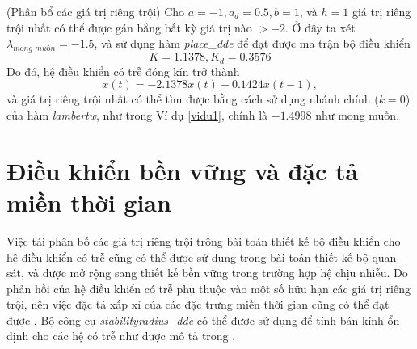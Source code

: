 \begin{vd}(Phân bổ các giá trị riêng trội)
	Cho $a=-1,a_d=0.5,b=1$, và $h=1$ giá trị riêng trội nhất có thể được gán bằng bất kỳ giá trị nào $>-2$. Ở đây ta xét $\lambda_{\textit{mong muốn}}=-1.5$, và sử dụng hàm \textit{place\_dde} để đạt được ma trận bộ điều khiển
	$$K=1.1378,K_d=0.3576$$
	Do đó, hệ điều khiển có trễ đóng kín trở thành
	$$x(t)=-2.1378x(t)+0.1424x(t-1),$$
	và giá trị riêng trội nhất có thể tìm được bằng cách sử dụng nhánh chính ($k=0$) của hàm \textit{lambertw}, như trong Ví dụ \ref{vidu1}, chính là $-1.4998$ như mong muốn.
\end{vd}

\section{Điều khiển bền vững và đặc tả miền thời gian}
Việc tái phân bố các giá trị riêng trội trông bài toán thiết kế bộ điều khiển cho hệ điều khiển có trễ cũng có thể được sử dụng trong bài toán thiết kế bộ quan sát, và được mở rộng sang thiết kế bền vững trong trường hợp hệ chịu nhiễu. Do phản hồi của hệ điều khiển có trễ phụ thuộc vào một số hữu hạn các giá trị riêng trội, nên việc đặc tả xấp xỉ của các đặc trưng miền thời gian cũng có thể đạt được \cite{t29}. Bộ công cụ \textit{stabilityradius\_dde} có thể được sử dụng để tính bán kính ổn định cho các hệ có trễ như được mô tả trong \cite{t13,t27,t29}.
